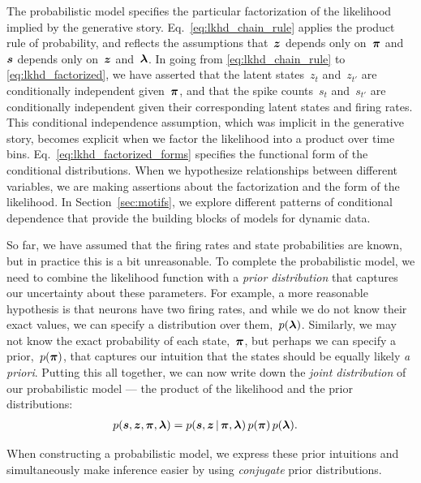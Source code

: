 The probabilistic model specifies the particular factorization of the
likelihood implied by the generative story.
Eq.~\ref{eq:lkhd_chain_rule} applies the product rule of
probability, and reflects the assumptions that~$\boldsymbol{z}$ depends only on~$\boldsymbol{\pi}$
and~$\boldsymbol{s}$ depends only on~$\boldsymbol{z}$ and~$\boldsymbol{\lambda}$. 
In going from \eqref{eq:lkhd_chain_rule} to
\eqref{eq:lkhd_factorized}, we have asserted that the latent
states~$z_t$ and~$z_{t'}$ are conditionally independent given~$\boldsymbol{\pi}$,
and that the spike counts~$s_{t}$ and~$s_{t'}$ are conditionally
independent given their corresponding latent states and firing rates. This conditional
independence assumption, which was implicit in the generative story,
becomes explicit when we factor the likelihood into a product over
time bins.  Eq.~\ref{eq:lkhd_factorized_forms} specifies the
functional form of the conditional distributions.  When we hypothesize
relationships between different variables, we are making assertions
about the factorization and the form of the likelihood.  In
Section~\ref{sec:motifs}, we explore different patterns of conditional
dependence that provide the building blocks of models for dynamic
data.

So far, we have assumed that the firing rates and state probabilities are known, but in practice 
this is a bit unreasonable. To complete the probabilistic model, we need 
to combine the likelihood function with a \emph{prior distribution} that 
captures our uncertainty about these parameters. 
For example, a more reasonable hypothesis is that neurons have 
two firing rates, and while we do not know their exact values, we can 
specify a distribution over them,~$p(\boldsymbol{\lambda})$. Similarly, we may not know 
the exact probability of each state,~$\boldsymbol{\pi}$, but perhaps we can specify 
a prior,~$p(\boldsymbol{\pi})$, that captures our intuition that the states should
be equally likely \emph{a priori}.
Putting this all together, we can now write down the \emph{joint
  distribution} of our probabilistic model --- the
product of the likelihood and the prior distributions:
\begin{align}
  \label{eq:full_joint}
  p(\boldsymbol{s}, \boldsymbol{z}, \boldsymbol{\pi}, \boldsymbol{\lambda}) 
  &= p(\boldsymbol{s}, \boldsymbol{z} \,|\, \boldsymbol{\pi}, \boldsymbol{\lambda}) \, p(\boldsymbol{\pi}) \, p(\boldsymbol{\lambda}).
\end{align}

When constructing a probabilistic model, we express these prior
intuitions and simultaneously make inference easier by using
\emph{conjugate} prior distributions.


